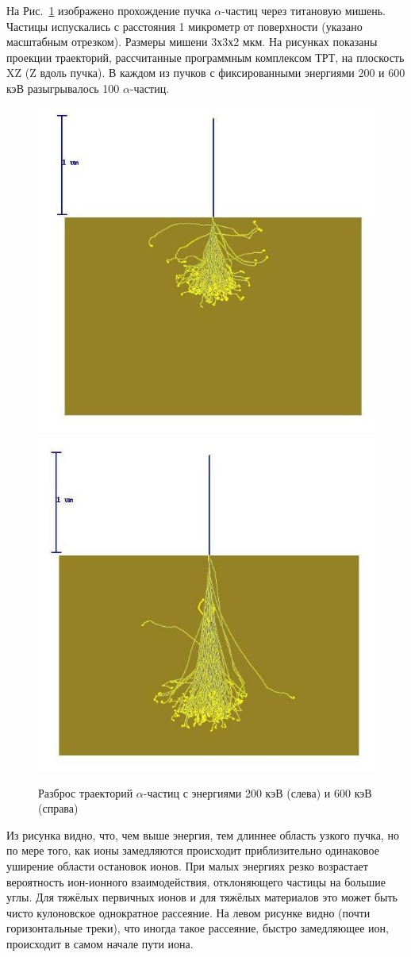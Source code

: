 \documentclass[a4paper,12pt]{article}
\begin{document}
\begin{large}
  На Рис.~\ref{fig:MultScat} изображено прохождение пучка $\alpha$-частиц через титановую мишень.
  Частицы испускались с расстояния 1 микрометр от поверхности (указано масштабным отрезком). Размеры мишени 3х3х2 мкм.
  На рисунках показаны проекции траекторий, рассчитанные программным комплексом ТРТ, на плоскость XZ (Z вдоль пучка).
  В каждом из пучков с фиксированными энергиями 200 и 600 кэВ разыгрывалось 100 $\alpha$-частиц.

  \begin{figure}[ht]
    {
       \includegraphics[width=0.45\linewidth]{images/alphaInTi_200_keV_100_part}
       \includegraphics[width=0.45\linewidth]{images/alphaInTi_600_keV_100_part}
    }
    \caption{Разброс траекторий $\alpha$-частиц с энергиями 200 кэВ (слева) и 600 кэВ (справа)}
    \label{fig:MultScat}
  \end{figure}

  Из рисунка видно, что, чем выше энергия, тем длиннее область узкого пучка, но по мере того, как ионы замедляются происходит приблизительно одинаковое уширение области остановок ионов.
  При малых энергиях резко возрастает вероятность ион-ионного взаимодействия, отклоняющего частицы на большие углы.
  Для тяжёлых первичных ионов и для тяжёлых материалов это может быть чисто кулоновское однократное рассеяние.
  На левом рисунке видно (почти горизонтальные треки), что иногда такое рассеяние, быстро замедляющее ион, происходит в самом начале пути иона.


\end{large}
\end{document}
